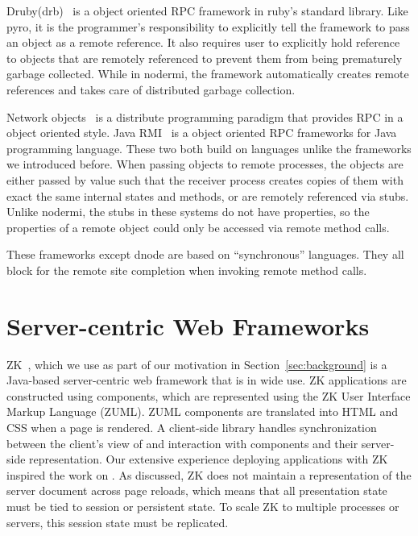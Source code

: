 Druby(drb)~\cite{druby} is a object oriented RPC framework in ruby's standard library.
Like pyro, it is the programmer's responsibility to explicitly tell the
framework to pass an object as a remote reference.
It also requires user to explicitly hold reference 
to objects that are remotely referenced 
to prevent them from being prematurely garbage collected.
While in nodermi, the framework automatically creates remote references and takes care of
distributed garbage collection.

Network objects~\cite{birrell1993distributed}
is a distribute programming paradigm
that provides RPC in a object oriented style.
Java RMI~\cite{j2eedoc}
is a object oriented RPC frameworks for Java programming language.
These two both build on languages unlike the frameworks we introduced
before.
When passing objects to remote processes,
the objects are either passed by value such that 
 the receiver process creates copies of them
 with exact the same internal states and methods,
or are remotely referenced via stubs.
Unlike nodermi,
the stubs in these systems do not have properties,
so the properties of a remote object could
only be accessed via remote method calls.


These frameworks except dnode are based on ``synchronous'' languages.
They all block for the remote site completion when invoking remote
method calls.




\section{Server-centric Web Frameworks}

ZK~\cite{ChenCheng:book2007},
which we use as part of our motivation in Section~\ref{sec:background}
is a Java-based server-centric web framework that is in wide use.
ZK applications are constructed using components, which are represented
using the ZK User Interface Markup Language (ZUML).  ZUML components
are translated into HTML and CSS when a page is rendered.
A client-side library handles synchronization between the client's 
view of and interaction with components and their server-side 
representation.  Our extensive experience deploying applications
with ZK~\cite{Tilevich:aop2008,EdwardsBack:csc2011} inspired the 
work on \cb.  As discussed, ZK does not maintain a representation
of the server document across page reloads, which means that
all presentation state must be tied to session or persistent state.
To scale ZK to multiple processes or servers, this session state must
be replicated.

